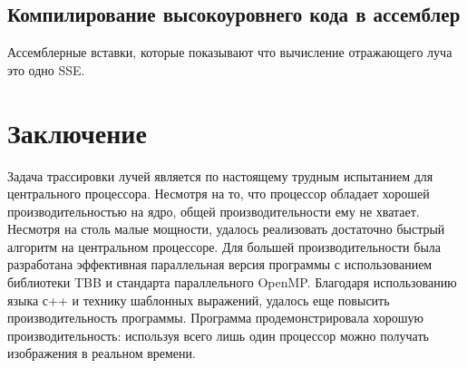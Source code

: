 \documentclass[12pt, a4paper]{article}
\begin{document}
\subsection{Компилирование высокоуровнего кода в ассемблер}

Ассемблерные вставки, которые показывают что вычисление отражающего луча это одно SSE.


\newpage
\section*{Заключение}
Задача трассировки лучей является по настоящему трудным испытанием для центрального процессора. Несмотря на то, что процессор обладает хорошей производительностью на ядро, общей производительности ему не хватает. Несмотря на столь малые мощности, удалось реализовать достаточно быстрый алгоритм на центральном процессоре. Для большей производительности была разработана эффективная параллельная версия программы с использованием библиотеки TBB и
стандарта параллельного OpenMP. Благодаря использованию языка с++ и технику шаблонных выражений, удалось еще повысить производительность программы. Программа продемонстрировала хорошую производительность: используя всего лишь один процессор можно получать изображения в реальном времени.

\end{document}
